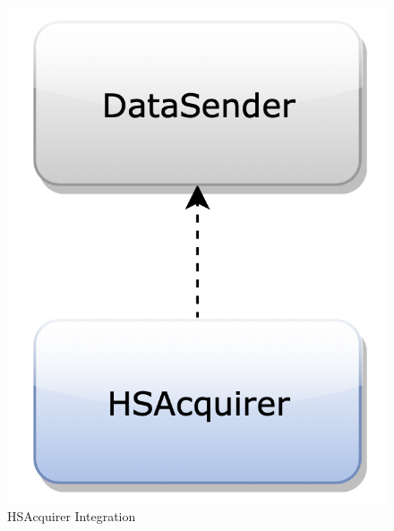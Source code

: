 \begin{figure}[H]
\begin{center}
\begin{minipage}[c]{.40\textwidth}
\includegraphics[scale=0.35]{Images/IntegrationPlanImages/fig10.png}
\caption{HSAcquirer Integration}
        \end{minipage}
      \end{center}
\end{figure}

\newpage

